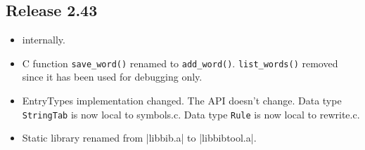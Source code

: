 \documentclass[11pt,a4paper]{scrartcl}
\newcommand\File[1]{\textsf{#1}}
\newenvironment{Release}[2]{%
  \def\tmp{#2}%
  \section*{Release #1 \ifx\tmp\empty\else{\normalsize[#2]}\fi}
  \begin{itemize}
}{\end{itemize}}
\newenvironment{New}[1]{\item }{}
\newenvironment{Update}[1]{\item }{}
\begin{document}
\begin{multicols}
\begin{Release}{2.43}{}
\begin{New}{gene}
    internally.
  \end{New}
  \begin{Update}{gene}
    C function \verb|save_word()| renamed to \verb|add_word()|.
    \verb|list_words()| removed since it has been used for debugging
    only.
  \end{Update}
  \begin{Update}{gene}
    EntryTypes implementation changed. The API doesn't change.
    Data type \verb|StringTab| is now local to \File{symbols.c}.
    Data type \verb|Rule| is now local to \File{rewrite.c}.
  \end{Update}
  \begin{Update}{gene}
    Static library renamed from |libbib.a| to |libbibtool.a|.
  \end{Update}
 \end{Release}


\end{multicols}
\end{document}
